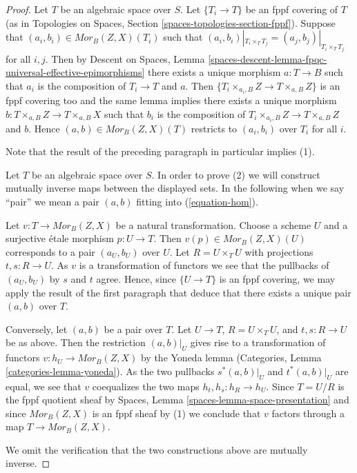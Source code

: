 \begin{proof}
Let $T$ be an algebraic space over $S$. Let $\{T_i \to T\}$ be an fppf
covering of $T$ (as in
Topologies on Spaces, Section \ref{spaces-topologies-section-fppf}).
Suppose that $(a_i, b_i) \in \mathit{Mor}_B(Z, X)(T_i)$ such
that $(a_i, b_i)|_{T_i \times_T T_j} = (a_j, b_j)|_{T_i \times_T T_j}$
for all $i, j$. Then by
Descent on Spaces,
Lemma \ref{spaces-descent-lemma-fpqc-universal-effective-epimorphisms}
there exists a unique morphism $a : T \to B$ such that $a_i$ is the
composition of $T_i \to T$ and $a$. Then
$\{T_i \times_{a_i, B} Z \to T \times_{a, B} Z\}$ is an fppf covering
too and the same lemma implies there exists a unique morphism
$b : T \times_{a, B} Z \to T \times_{a, B} X$ such that $b_i$ is the
composition of $T_i \times_{a_i, B} Z \to T \times_{a, B} Z$ and $b$. Hence
$(a, b) \in \mathit{Mor}_B(Z, X)(T)$ restricts to $(a_i, b_i)$
over $T_i$ for all $i$.

\medskip\noindent
Note that the result of the preceding paragraph in particular implies (1).

\medskip\noindent
Let $T$ be an algebraic space over $S$. In order to prove (2) we will
construct mutually inverse maps between the displayed sets. In the
following when we say ``pair'' we mean a pair $(a, b)$ fitting
into (\ref{equation-hom}).

\medskip\noindent
Let $v : T \to \mathit{Mor}_B(Z, X)$ be a natural transformation.
Choose a scheme $U$ and a surjective \'etale morphism $p : U \to T$.
Then $v(p) \in \mathit{Mor}_B(Z, X)(U)$ corresponds to a pair $(a_U, b_U)$
over $U$. Let $R = U \times_T U$ with projections $t, s : R \to U$.
As $v$ is a transformation of functors we see that the pullbacks of
$(a_U, b_U)$ by $s$ and $t$ agree. Hence, since $\{U \to T\}$ is an
fppf covering, we may apply the result of the first paragraph that
deduce that there exists a unique pair $(a, b)$ over $T$.

\medskip\noindent
Conversely, let $(a, b)$ be a pair over $T$.
Let $U \to T$, $R = U \times_T U$, and $t, s : R \to U$ be as
above. Then the restriction $(a, b)|_U$ gives rise to a
transformation of functors $v : h_U \to \mathit{Mor}_B(Z, X)$ by the
Yoneda lemma
(Categories, Lemma \ref{categories-lemma-yoneda}).
As the two pullbacks $s^*(a, b)|_U$ and $t^*(a, b)|_U$
are equal, we see that $v$ coequalizes the two maps
$h_t, h_s : h_R \to h_U$. Since $T = U/R$ is the fppf quotient sheaf by
Spaces, Lemma \ref{spaces-lemma-space-presentation}
and since $\mathit{Mor}_B(Z, X)$ is an fppf sheaf by (1) we conclude
that $v$ factors through a map $T \to \mathit{Mor}_B(Z, X)$.

\medskip\noindent
We omit the verification that the two constructions above are mutually
inverse.
\end{proof}

